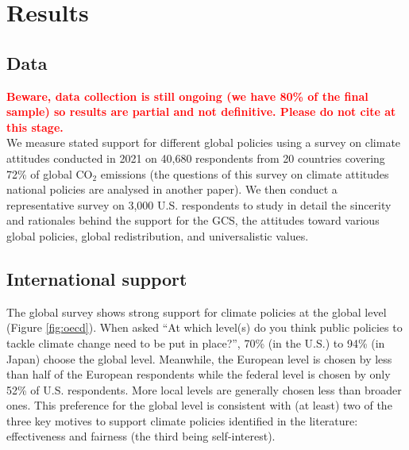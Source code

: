 \section{Results}
\subsection{Data}
\textcolor{red}{\textbf{Beware, data collection is still ongoing (we have 80\% of the final sample) so results are partial and not definitive. Please do not cite at this stage.}} \\
We measure stated support for different global policies using %
a survey on climate attitudes conducted in 2021 on 40,680 respondents from 20 countries covering 72\% of global CO$_\text{2}$ emissions (the questions of this survey on climate attitudes national policies are analysed in another paper\cite{dechezlepretre_fighting_2022}). We then conduct a representative survey on 3,000 U.S. respondents to study in detail the sincerity and rationales behind the support for the GCS, the attitudes toward various global policies, global redistribution, and universalistic values.

\subsection{International support}
The global survey shows strong support for climate policies at the global level (Figure \ref{fig:oecd}). When asked ``At which level(s) do you think public policies to tackle climate change need to be put in place?'', 70\% (in the U.S.) to 94\% (in Japan) choose the global level. Meanwhile, the European level is chosen by less than half of the European respondents while the federal level is chosen by only 52\% of U.S. respondents. More local levels are generally chosen less than broader ones. This preference for the global level is consistent with (at least) two of the three key motives to support climate policies identified in the literature:\cite{klenert_making_2018,douenne_yellow_2022,dechezlepretre_fighting_2022} effectiveness and fairness (the third being self-interest). 

